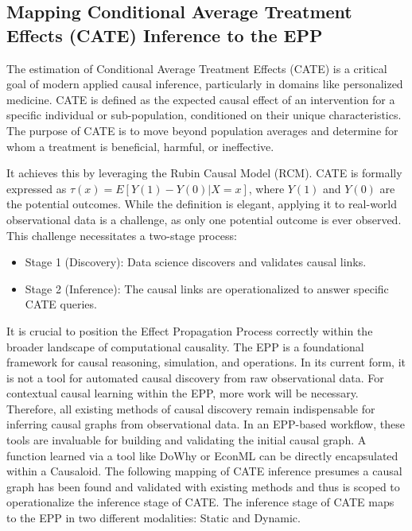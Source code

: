 %
%
\subsection{Mapping Conditional Average Treatment Effects (CATE) Inference to the EPP}
\label{sec:epp_cate}

The estimation of Conditional Average Treatment Effects (CATE) is a critical goal of modern applied causal inference, particularly in domains like personalized medicine. CATE is defined as the expected causal effect of an intervention for a specific individual or sub-population, conditioned on their unique characteristics. The purpose of CATE is to move beyond population averages and determine for whom a treatment is beneficial, harmful, or ineffective.

It achieves this by leveraging the Rubin Causal Model (RCM). CATE is formally expressed as $\tau(x) = E[Y(1) - Y(0) | X=x]$, where $Y(1)$ and $Y(0)$ are the potential outcomes. While the definition is elegant, applying it to real-world observational data is a challenge, as only one potential outcome is ever observed. This challenge necessitates a two-stage process:
\begin{itemize}
	\item Stage 1 (Discovery): Data science discovers and validates causal links.
	\item Stage 2 (Inference): The causal links are operationalized to answer specific CATE queries. 
\end{itemize} 

It is crucial to position the Effect Propagation Process correctly within the broader landscape of computational causality. The EPP is a foundational framework for causal reasoning, simulation, and operations. In its current form, it is not a tool for automated causal discovery from raw observational data. For contextual causal learning within the EPP, more work will be necessary. Therefore, all existing methods of causal discovery remain indispensable for inferring causal graphs from observational data. In an EPP-based workflow, these tools are invaluable for building and validating the initial causal graph. A function learned via a tool like DoWhy or EconML can be directly encapsulated within a Causaloid. The following mapping of CATE inference presumes a causal graph has been found and validated with existing methods and thus is scoped to operationalize the inference stage of CATE. The inference stage of CATE maps to the EPP in two different modalities: Static and Dynamic.


